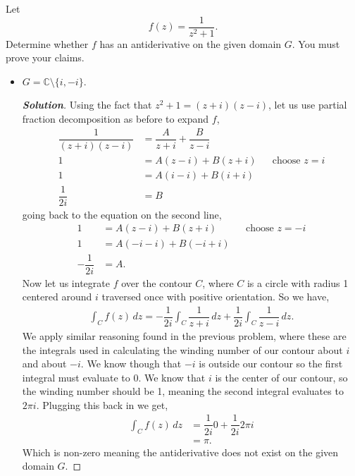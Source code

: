 \documentclass[11pt]{article}
\newenvironment{problem}[2][Problem\!]{\begin{trivlist}
\item[\hskip \labelsep {\bfseries #1}\hskip \labelsep {\bfseries #2}]}{\end{trivlist}}
\newenvironment{solution}{\begin{proof}[\textbf{\textit{Solution}}] }{\end{proof}}
\newcommand{\cc}{\mathbb C}   %
\begin{document}
\newpage  %

\begin{problem}{7.5}
Let \[f(z) = \frac{1}{z^2+1}.\]
Determine whether $f$ has an antiderivative on the given domain $G$. You must prove your claims. 
\begin{itemize}[itemsep=3em]
\item[(a)] $G = \cc \setminus \{i,-i\}$.
\begin{solution}
  Using the fact that $z^{2} + 1 = (z+i)(z-i)$, let us use partial fraction decomposition as before to expand $f$,
  \begin{align*}
    \dfrac{1}{(z + i)(z - i)} &=\dfrac{A}{z+i} + \dfrac{B}{z - i} \\
    1 &= A(z-i) + B(z+i) && \text{choose $z = i$} \\
    1 &= A(i - i) + B(i + i) \\
    \dfrac{1}{2i} &= B  
  \end{align*}
  going back to the equation on the second line,
  \begin{align*}
    1 &= A(z-i) + B(z +i) && \text{choose $z = -i$} \\
    1 &= A(-i - i) + B(-i + i) \\
    -\dfrac{1}{2i} &= A.
  \end{align*}
  Now let us integrate $f$ over the contour $C$, where $C$ is a circle with radius 1 centered around $i$ traversed once with positive orientation. So we have,
  \begin{align*}
    \int_C f(z)\, d z = -\dfrac{1}{2i}\int_C \dfrac{1}{z + i}\, d z + \dfrac{1}{2i}\int_C \dfrac{1}{z-i} \, d z.
  \end{align*}
  We apply similar reasoning found in the previous problem, where these are the integrals used in calculating the winding number of our contour about $i$ and about $-i$. We know though that $-i$ is outside our contour so the first integral must evaluate to 0. We know that $i$ is the center of our contour, so the winding number should be 1, meaning the second integral evaluates to $2\pi i $. Plugging this back in we get,
  \begin{align*}
    \int_C f(z)\, d z &= \dfrac{1}{2i}0 + \dfrac{1}{2i} 2\pi i  \\
    &= \pi.  
  \end{align*}
  Which is non-zero meaning the antiderivative does not exist on the given domain $G$. 

  
\end{solution}


\end{itemize}
\end{problem}
\end{document}
